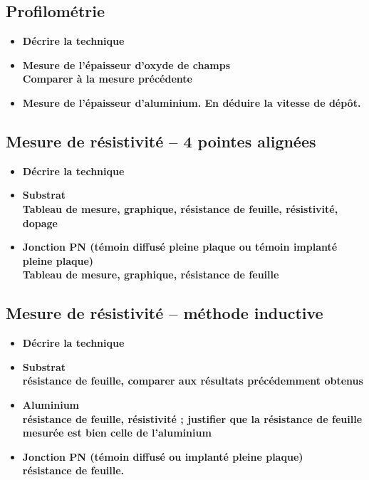 \documentclass[11pt]{article}
\begin{document}
\subsection{Profilom\'etrie}

\begin{itemize}
\item \textbf{ D\'ecrire la technique  }
\item \textbf{ Mesure de l'\'epaisseur d'oxyde de champs \\ 
 Comparer \`a la mesure pr\'ec\'edente}
\item \textbf{ Mesure de l'\'epaisseur d'aluminium. En d\'eduire la vitesse de d\'ep\^ot.}
\end{itemize}

\subsection{Mesure de r\'esistivit\'e -- 4 pointes align\'ees}

\begin{itemize}
\item \textbf{ D\'ecrire la technique  }
\item \textbf{ Substrat \\ 
  Tableau de mesure, graphique, r\'esistance de feuille, r\'esistivit\'e, dopage}
\item \textbf{ Jonction PN (t\'emoin diffus\'e pleine plaque ou t\'emoin implant\'e pleine plaque) \\ 
Tableau de mesure, graphique, r\'esistance de feuille}
\end{itemize}

    

\subsection{Mesure de r\'esistivit\'e – m\'ethode inductive}

\begin{itemize}
\item \textbf{ D\'ecrire la technique  }
\item \textbf{ Substrat \\ 
   r\'esistance de feuille, comparer aux r\'esultats pr\'ec\'edemment obtenus}
\item \textbf{ Aluminium \\ 
r\'esistance de feuille, r\'esistivit\'e ; justifier que la r\'esistance de feuille mesur\'ee est bien celle de
     l'aluminium}
\item \textbf{Jonction PN (t\'emoin diffus\'e ou implant\'e pleine plaque) \\
    r\'esistance de feuille.}
\end{itemize}
\end{document}

